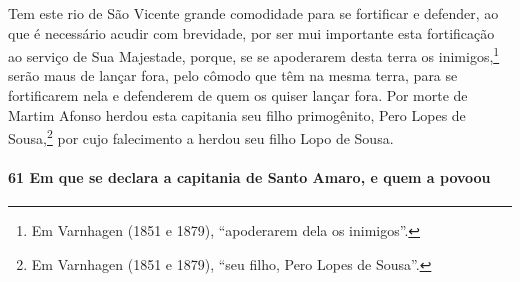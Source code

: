 Tem este rio de São Vicente grande comodidade para se fortificar e defender, ao que é
necessário acudir com brevidade, por ser mui importante esta fortificação ao serviço de
Sua Majestade, porque, se se apoderarem desta terra os inimigos,\footnote{ Em Varnhagen
(1851 e 1879), ``apoderarem dela os inimigos''.} serão maus de lançar fora, pelo cômodo
que têm na mesma terra, para se fortificarem nela e defenderem de quem os quiser lançar
fora. Por morte de Martim Afonso herdou esta capitania seu filho primogênito, Pero Lopes
de Sousa,\footnote{ Em Varnhagen (1851 e 1879), ``seu filho, Pero Lopes de Sousa''.} por
cujo falecimento a herdou seu filho Lopo de Sousa.

\paragraph{61 Em que se declara a capitania de Santo Amaro, e quem a povoou}

